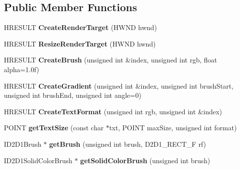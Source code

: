\subsection*{Public Member Functions}
\begin{DoxyCompactItemize}
\item 
\hypertarget{class_engine_render_d2_d_a56684860134f55d48282e7f832b99025}{H\-R\-E\-S\-U\-L\-T {\bfseries Create\-Render\-Target} (H\-W\-N\-D hwnd)}\label{class_engine_render_d2_d_a56684860134f55d48282e7f832b99025}

\item 
\hypertarget{class_engine_render_d2_d_a2397760c24922853f424fcdfbcdeca5f}{H\-R\-E\-S\-U\-L\-T {\bfseries Resize\-Render\-Target} (H\-W\-N\-D hwnd)}\label{class_engine_render_d2_d_a2397760c24922853f424fcdfbcdeca5f}

\item 
\hypertarget{class_engine_render_d2_d_a2d1d72284ef7b0d2c1ca9ae7728b5baf}{H\-R\-E\-S\-U\-L\-T {\bfseries Create\-Brush} (unsigned int \&index, unsigned int rgb, float alpha=1.\-0f)}\label{class_engine_render_d2_d_a2d1d72284ef7b0d2c1ca9ae7728b5baf}

\item 
\hypertarget{class_engine_render_d2_d_adf5dbefc823835b11a825514ea0049d3}{H\-R\-E\-S\-U\-L\-T {\bfseries Create\-Gradient} (unsigned int \&index, unsigned int brush\-Start, unsigned int brush\-End, unsigned int angle=0)}\label{class_engine_render_d2_d_adf5dbefc823835b11a825514ea0049d3}

\item 
\hypertarget{class_engine_render_d2_d_a96bfcb4a434d7a48d71ddfb1d937c162}{H\-R\-E\-S\-U\-L\-T {\bfseries Create\-Text\-Format} (unsigned int rgb, unsigned int \&index)}\label{class_engine_render_d2_d_a96bfcb4a434d7a48d71ddfb1d937c162}

\item 
\hypertarget{class_engine_render_d2_d_a1099cab62b9fd79e17acdc68baab91b4}{P\-O\-I\-N\-T {\bfseries get\-Text\-Size} (const char $\ast$txt, P\-O\-I\-N\-T max\-Size, unsigned int format)}\label{class_engine_render_d2_d_a1099cab62b9fd79e17acdc68baab91b4}

\item 
\hypertarget{class_engine_render_d2_d_ac70574232e697bf3592cc65eb4ac8dc5}{I\-D2\-D1\-Brush $\ast$ {\bfseries get\-Brush} (unsigned int brush, D2\-D1\-\_\-\-R\-E\-C\-T\-\_\-\-F rf)}\label{class_engine_render_d2_d_ac70574232e697bf3592cc65eb4ac8dc5}

\item 
\hypertarget{class_engine_render_d2_d_a9be2d9733ba86d23cea5758d124bded9}{I\-D2\-D1\-Solid\-Color\-Brush $\ast$ {\bfseries get\-Solid\-Color\-Brush} (unsigned int brush)}\label{class_engine_render_d2_d_a9be2d9733ba86d23cea5758d124bded9}


\end{DoxyCompactItemize}
